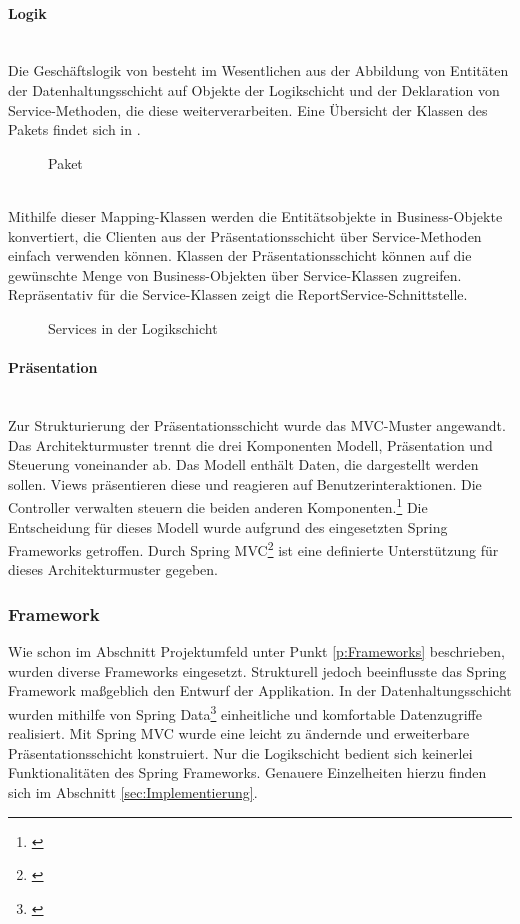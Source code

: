 \paragraph{Logik} ~\\
\label{p:Logik}
Die Geschäftslogik von \projektName besteht im Wesentlichen aus der Abbildung von Entitäten der Datenhaltungsschicht auf Objekte der Logikschicht und der Deklaration von Service-Methoden, die diese weiterverarbeiten. Eine Übersicht der Klassen des Pakets  findet sich in .
\begin{figure}[htb]
	\centering
	\caption{Paket }
	\label{fig:Mapping}
\end{figure}\\
Mithilfe dieser Mapping-Klassen werden die Entitätsobjekte in Business-Objekte konvertiert, die Clienten aus der Präsentationsschicht über Service-Methoden einfach verwenden können. Klassen der Präsentationsschicht können auf die gewünschte Menge von Business-Objekten über Service-Klassen zugreifen. Repräsentativ für die Service-Klassen zeigt  die ReportService-Schnittstelle.
\begin{figure}[htb]
	\centering
	\caption{Services in der Logikschicht}
	\label{fig:Logik}
\end{figure}

\paragraph{Präsentation} ~\\
\label{p:Praesentation}
Zur Strukturierung der Präsentationsschicht wurde das \ac{MVC}-Muster angewandt. Das Architekturmuster trennt die drei Komponenten Modell, Präsentation und Steuerung voneinander ab. Das Modell enthält Daten, die dargestellt werden sollen. Views präsentieren diese und reagieren auf Benutzerinteraktionen. Die Controller verwalten \bzw steuern die beiden anderen Komponenten.\footnote{\Vgl \cite{wiki:mvc}}
Die Entscheidung für dieses Modell wurde aufgrund des eingesetzten Spring Frameworks getroffen. Durch Spring MVC\footnote{\Vgl \cite{spring:mvc}} ist eine definierte Unterstützung für dieses Architekturmuster gegeben.

\subsubsection{Framework}
\label{sec:Framework}
Wie schon im Abschnitt Projektumfeld unter Punkt \ref{p:Frameworks} beschrieben, wurden diverse Frameworks eingesetzt. Strukturell jedoch beeinflusste das Spring Framework maßgeblich den Entwurf der Applikation. In der Datenhaltungsschicht wurden mithilfe von Spring Data\footnote{\Vgl \cite{spring:data}} einheitliche und komfortable Datenzugriffe realisiert. Mit Spring MVC wurde eine leicht zu ändernde und erweiterbare Präsentationsschicht konstruiert. Nur die Logikschicht bedient sich keinerlei Funktionalitäten des Spring Frameworks. Genauere Einzelheiten hierzu finden sich im Abschnitt \ref{sec:Implementierung}.

